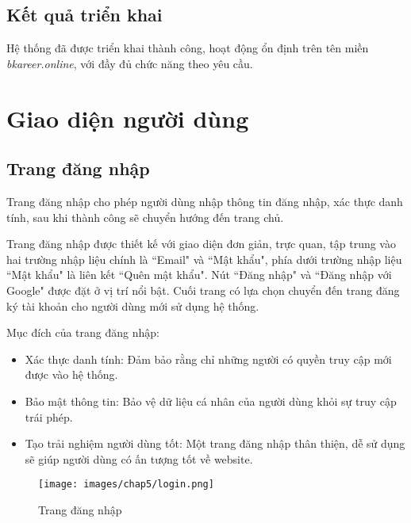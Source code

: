 \subsection{Kết quả triển khai}
Hệ thống đã được triển khai thành công, hoạt động ổn định trên tên miền \textit{bkareer.online}, với đầy đủ chức năng theo yêu cầu.


\section{Giao diện người dùng}
\subsection{Trang đăng nhập}
Trang đăng nhập cho phép người dùng nhập thông tin đăng nhập, xác thực danh tính, sau khi thành công sẽ chuyển hướng đến trang chủ.

Trang đăng nhập được thiết kế với giao diện đơn giản, trực quan, tập trung vào hai trường nhập liệu chính là ``Email" và ``Mật khẩu", phía dưới trường nhập liệu ``Mật khẩu" là liên kết ``Quên mật khẩu". Nút ``Đăng nhập" và ``Đăng nhập với Google" được đặt ở vị trí nổi bật. Cuối trang có lựa chọn chuyển đến trang đăng ký tài khoản cho người dùng mới sử dụng hệ thống.

Mục đích của trang đăng nhập:
\begin{itemize}
    \item Xác thực danh tính: Đảm bảo rằng chỉ những người có quyền truy cập mới được vào hệ thống.
    \item Bảo mật thông tin: Bảo vệ dữ liệu cá nhân của người dùng khỏi sự truy cập trái phép.
    \item Tạo trải nghiệm người dùng tốt: Một trang đăng nhập thân thiện, dễ sử dụng sẽ giúp người dùng có ấn tượng tốt về website.
\end{itemize}

\begin{figure}[H]
    \centering
    \texttt{[image: images/chap5/login.png]}
    \vspace{0.5cm}
    \caption{Trang đăng nhập}
\end{figure}

